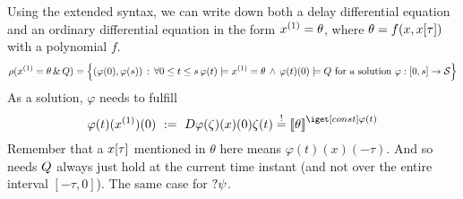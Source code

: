 
            Using the extended syntax, we can write down both a delay differential equation and an ordinary differential equation in the form $\D{x}=\theta$, where $\theta=f(x,x[\tau])$ with a polynomial $f$.
            \begin{equation}
                \rho(\hevolvein{\D{x}=\theta}{\ivr}) = \left\{
                    (\varphi(0),\varphi(s))\,:\,\lforall{0\leq t\leq s}{\varphi(t)\models \D{x}=\theta\,\wedge\,\varphi(t)(0)\models\ivr}\text{ for a solution } \varphi:[0,s]\rightarrow\states \right\}
            \end{equation}
            As a solution, $\varphi$ needs to fulfill
            \begin{equation}
                \varphi(t)(\D{x})(0) \defeq \DD{\varphi(\zeta)(x)(0)}{\zeta}(t) \stackrel{!}{=} \imodel[]{\varphi(t)}{\theta}
            \end{equation}
            Remember that a $x[\tau]$ mentioned in $\theta$ here means $\varphi(t)(x)(-\tau)$.
            And so needs $Q$ always just hold at the current time instant (and not over the entire interval $[-\tau,0]$). The same case for $?\psi$.

